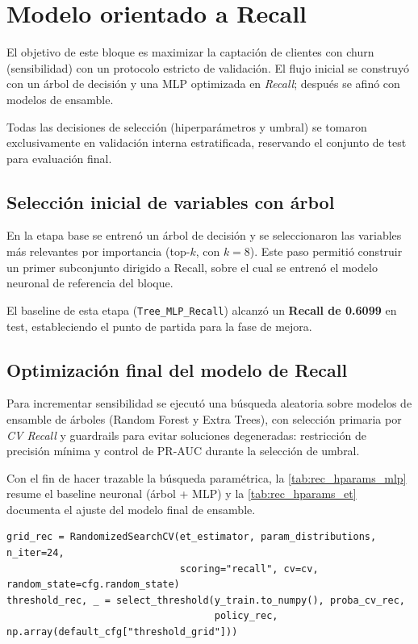 \section{Modelo orientado a Recall}

El objetivo de este bloque es maximizar la captación de clientes con churn (sensibilidad) con un protocolo estricto de validación. El flujo inicial se construyó con un árbol de decisión y una MLP optimizada en \textit{Recall}; después se afinó con modelos de ensamble.

Todas las decisiones de selección (hiperparámetros y umbral) se tomaron exclusivamente en validación interna estratificada, reservando el conjunto de test para evaluación final.

\subsection{Selección inicial de variables con árbol}

En la etapa base se entrenó un árbol de decisión y se seleccionaron las variables más relevantes por importancia (top-$k$, con $k=8$). Este paso permitió construir un primer subconjunto dirigido a Recall, sobre el cual se entrenó el modelo neuronal de referencia del bloque.

El baseline de esta etapa (\texttt{Tree\_MLP\_Recall}) alcanzó un \textbf{Recall de 0.6099} en test, estableciendo el punto de partida para la fase de mejora.

\subsection{Optimización final del modelo de Recall}

Para incrementar sensibilidad se ejecutó una búsqueda aleatoria sobre modelos de ensamble de árboles (Random Forest y Extra Trees), con selección primaria por \textit{CV Recall} y guardrails para evitar soluciones degeneradas: restricción de precisión mínima y control de PR-AUC durante la selección de umbral.

Con el fin de hacer trazable la búsqueda paramétrica, la \cref{tab:rec_hparams_mlp} resume el baseline neuronal (árbol + MLP) y la \cref{tab:rec_hparams_et} documenta el ajuste del modelo final de ensamble.

\begin{lstlisting}[caption={Búsqueda compacta en Recall},label={lst:recall_search}]
grid_rec = RandomizedSearchCV(et_estimator, param_distributions, n_iter=24,
							  scoring="recall", cv=cv, random_state=cfg.random_state)
threshold_rec, _ = select_threshold(y_train.to_numpy(), proba_cv_rec,
									policy_rec, np.array(default_cfg["threshold_grid"]))
\end{lstlisting}

